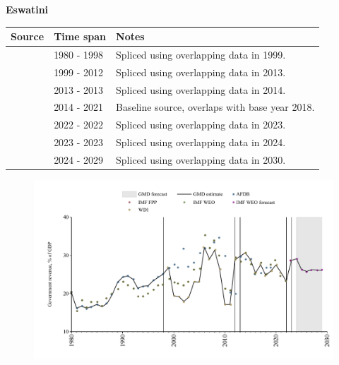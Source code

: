 \documentclass[12pt,a4paper,landscape]{article}
\begin{document}
\begin{adjustbox}{max totalsize={\paperwidth}{\paperheight},center}
\begin{minipage}[t][\textheight][t]{\textwidth}
\vspace*{0.5cm}
{}
\begin{center}
{\Large\bfseries Eswatini}
\end{center}
\vspace{0.5cm}
\begin{table}[H]
\centering
\small
\begin{tabular}{|l|l|l|}
\hline
\textbf{Source} & \textbf{Time span} & \textbf{Notes} \\
\hline
\rowcolor{white}\cite{AFDB}& 1980 - 1998 &Spliced using overlapping data in 1999.\\
\rowcolor{lightgray}\cite{WDI}& 1999 - 2012 &Spliced using overlapping data in 2013.\\
\rowcolor{white}\cite{AFDB}& 2013 - 2013 &Spliced using overlapping data in 2014.\\
\rowcolor{lightgray}\cite{WDI}& 2014 - 2021 &Baseline source, overlaps with base year 2018.\\
\rowcolor{white}\cite{IMF_WEO}& 2022 - 2022 &Spliced using overlapping data in 2023.\\
\rowcolor{lightgray}\cite{IMF_FPP}& 2023 - 2023 &Spliced using overlapping data in 2024.\\
\rowcolor{white}\cite{IMF_WEO_forecast}& 2024 - 2029 &Spliced using overlapping data in 2030.\\
\hline
\end{tabular}
\end{table}
\begin{figure}[H]
\centering
\includegraphics[width=\textwidth,height=0.6\textheight,keepaspectratio]{graphs/SWZ_govrev_GDP.pdf}
\end{figure}
\end{minipage}
\end{adjustbox}
\end{document}
